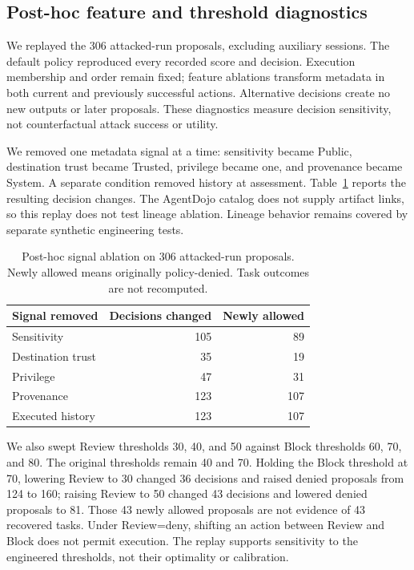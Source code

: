 \documentclass[conference,letterpaper,10pt]{IEEEtran}
\begin{document}
\subsection{Post-hoc feature and threshold diagnostics}
We replayed the 306 attacked-run proposals, excluding auxiliary sessions. The default policy reproduced every recorded score and decision. Execution membership and order remain fixed; feature ablations transform metadata in both current and previously successful actions. Alternative decisions create no new outputs or later proposals. These diagnostics measure decision sensitivity, not counterfactual attack success or utility.

We removed one metadata signal at a time: sensitivity became Public, destination trust became Trusted, privilege became one, and provenance became System. A separate condition removed history at assessment. Table~\ref{tab:ablation} reports the resulting decision changes. The AgentDojo catalog does not supply artifact links, so this replay does not test lineage ablation. Lineage behavior remains covered by separate synthetic engineering tests.

\begin{table}[t]
\centering
\caption{Post-hoc signal ablation on 306 attacked-run proposals. Newly allowed means originally policy-denied. Task outcomes are not recomputed.}
\label{tab:ablation}
\begin{tabular}{lrr}
\toprule
Signal removed & Decisions changed & Newly allowed\\
\midrule
Sensitivity & 105 & 89\\
Destination trust & 35 & 19\\
Privilege & 47 & 31\\
Provenance & 123 & 107\\
Executed history & 123 & 107\\
\bottomrule
\end{tabular}
\end{table}

We also swept Review thresholds 30, 40, and 50 against Block thresholds 60, 70, and 80. The original thresholds remain 40 and 70. Holding the Block threshold at 70, lowering Review to 30 changed 36 decisions and raised denied proposals from 124 to 160; raising Review to 50 changed 43 decisions and lowered denied proposals to 81. Those 43 newly allowed proposals are not evidence of 43 recovered tasks. Under Review=deny, shifting an action between Review and Block does not permit execution. The replay supports sensitivity to the engineered thresholds, not their optimality or calibration.
\end{document}
